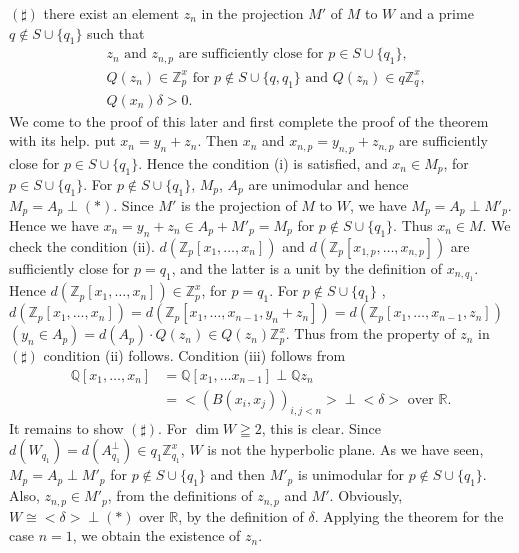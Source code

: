 $(\sharp)$ there exist an element $z_n$ in the projection $M'$ of $M$
to $W$ and a prime $q \not\in S \cup \{ q_1\}$ such that 
\begin{align*}
& z_n \text{ and } z_{n,p} \text{ are sufficiently close for }
p\in S \cup \{q_1\},\\
& Q(z_n) \in \mathbb{Z}^x_p \text{ for } p \not\in S \cup \{
q,q_1\} \text{ and } Q(z_n) \in q \mathbb{Z}^x_q,\\
& Q(x_n) \delta >0.
\end{align*}\pageoriginale 
We come to the proof of this later and first complete the proof of the
theorem with its help. put $x_n = y_n + z_n$. Then $x_n$ and $x_{n,p}
= y_{n,p} + z_{n,p}$ are sufficiently close for $p\in
S \cup \{ q_1\}$. Hence the condition (i) is satisfied, and
$x_n \in M_p$, for $p\in S \cup \{ q_1\}$. For
$p\not\in S \cup \{ q_1\}$, $M_p$, $A_p$ are unimodular and hence
$M_p=A_p \perp (\ast)$. Since $M'$ is the projection of $M$ to $W$, we
have $M_p=A_p \perp M'_p$. Hence we have $x_n = y_n + z_n \in
A_p + M'_p =M_p$ for $p\not\in S \cup \{q_1\}$. Thus $x_n \in
M$. We check the condition (ii). $d(\mathbb{Z}_p[x_1, \ldots, x_n])$
and $d(\mathbb{Z}_p[x_{1,p},\ldots, x_{n,p}])$ are sufficiently close
for $p=q_1$, and the latter is a unit by the definition of
$x_{n,q_1}$. Hence $d(\mathbb{Z}_p[x_1,\ldots,
x_n]) \in \mathbb{Z}^x_p$, for $p=q_1$. For $p\not\in
S \cup \{q_1\}$ , $d(\mathbb{Z}_p[x_1, \ldots, x_n]) =
d(\mathbb{Z}_p[x_1, \ldots, x_{n-1}, y_n + z_n]) = d(\mathbb{Z}_p[x_1,
\ldots, x_{n-1}, z_n])$ $(y_n \in A_p)=d(A_p)\cdot
Q(z_{n}) \in Q(z_n) \mathbb{Z}^x_p$. Thus from the property of
$z_n$ in $(\sharp)$ condition (ii) follows. Condition (iii) follows
from 
\begin{align*}
\mathbb{Q}[x_1,\ldots, x_n] &= \mathbb{Q} [x_1, \ldots
x_{n-1}] \perp \mathbb{Q} z_n\\
&= <(B(x_i, x_j))_{i,j <n}> \perp
<\delta> \text{ over } \mathbb{R}.
\end{align*}
It remains to show $(\sharp)$. For $\dim W \geqq 2$, this is
clear. Since $d(W_{q_1}) = d(A^{\perp}_{q_1}) \in
q_1 \mathbb{Z}^x_{q_1}$, $W$ is not the hyperbolic plane. As we have
seen, $M_p = A_p \perp M'_p$ for $p\not\in S \cup \{ q_1\}$ and then
$M'_p$ is unimodular for $p\not\in S\cup \{ q_1\}$. Also,
$z_{n,p} \in M'_p$, from the definitions of $z_{n,p}$ and
$M'$. Obviously, $W \cong <\delta> \perp (\ast)$ over $\mathbb{R}$, by
the definition of $\delta$. Applying the theorem for the case $n=1$,
we obtain the existence of $z_n$.

